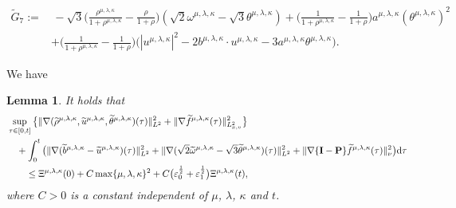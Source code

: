 \documentclass[reqno,11pt]{amsart}
\theoremstyle{plain}
\newtheorem{lem}[thm]{Lemma}
\numberwithin{equation}{section}
\newcommand{\eps}{{\varepsilon}}
\begin{document}
\begin{equation*}
\begin{aligned}
\widetilde{G}_7:=&\,-\sqrt{3}\Big(\frac{\rho^{\mu,\lambda,\kappa}}{1+\rho^{\mu,\lambda,\kappa}}-\frac{\rho}{1+\rho}\Big)(\sqrt{2}\omega^{\mu,\lambda,\kappa}-\sqrt{3}\theta^{\mu,\lambda,\kappa})+\Big(\frac{1}{1+\rho^{\mu,\lambda,\kappa}}-\frac{1}{1+\rho}\Big) a^{\mu,\lambda,\kappa}(\theta^{\mu,\lambda,\kappa})^2\nonumber\\
&+\Big(\frac{1}{1+\rho^{\mu,\lambda,\kappa}}-\frac{1}{1+\rho}\Big)\big(| {u}^{\mu,\lambda,\kappa}|^2-2b^{\mu,\lambda,\kappa}\cdot u^{\mu,\lambda,\kappa}-3a^{\mu,\lambda,\kappa}\theta^{\mu,\lambda,\kappa} \big).
\end{aligned}
\end{equation*} 




We have 

\begin{lem}\label{L4.2}
It holds that
\begin{align}\label{G4.16}
&\sup_{\tau\in[0,t]}\big\{\|\nabla(\widetilde{\rho}^{\mu,\lambda,\kappa},\widetilde{u}^{\mu,\lambda,\kappa},
\widetilde{\theta}^{\mu,\lambda,\kappa})(\tau)\|_{L^2}^2
+\|\nabla\widetilde{f}^{\mu,\lambda,\kappa}(\tau)\|_{L_{x,v}^2}^2\big\}  \nonumber\\
&\quad +\int_{0}^t\big( \|\nabla(\widetilde{b}^{\mu,\lambda,\kappa}-\widetilde{u}^{\mu,\lambda,\kappa})(\tau)\|_{L^2}^2 +\|\nabla(\sqrt{2}\widetilde{\omega}^{\mu,\lambda,\kappa}-\sqrt{3}\widetilde{\theta}^{\mu,\lambda,\kappa})(\tau)\|_{L^2}^2+\|  \nabla\{\mathbf{I}-\mathbf{P}\}\widetilde{f}^{\mu,\lambda,\kappa}(\tau)\|_{\nu}^2 \big) {\rm d}\tau \nonumber\\
&\quad\quad \leq {\Xi} ^{\mu,\lambda,\kappa}(0)+C\max\{\mu,\lambda,\kappa\}^2+C \big(\eps_0^\frac{1}{2}  +\eps_1^\frac{1}{2}\big){\Xi} ^{\mu,\lambda,\kappa}(t),
\end{align}
where $C>0$ is a constant independent of $\mu$, $\lambda$,   $\kappa$ and   $t$.
\end{lem}
\end{document}
